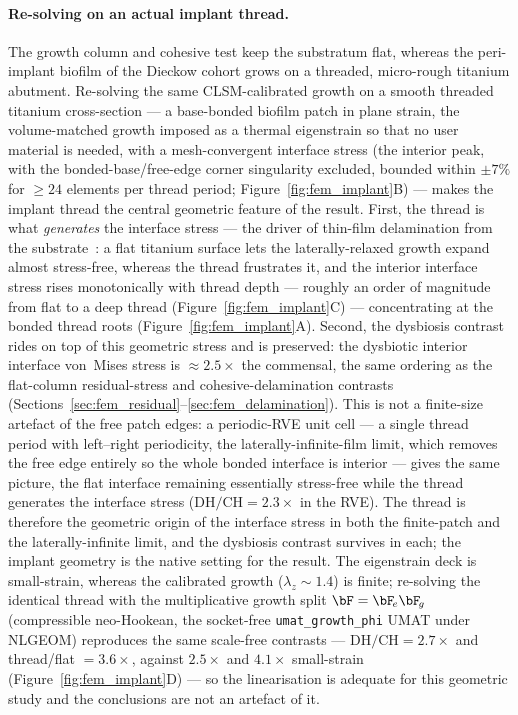 \paragraph{Re-solving on an actual implant thread.} The growth column and cohesive test keep
the substratum flat, whereas the peri-implant biofilm of the Dieckow cohort grows on a
threaded, micro-rough titanium abutment. Re-solving the same CLSM-calibrated growth on a smooth
threaded titanium cross-section --- a base-bonded biofilm patch in plane strain, the
volume-matched growth imposed as a thermal eigenstrain so that no user material is needed, with a
mesh-convergent interface stress (the interior peak, with the bonded-base/free-edge corner
singularity excluded, bounded within $\pm7\%$ for $\ge24$ elements per thread period;
Figure~\ref{fig:fem_implant}B) --- makes the implant thread the central geometric feature of the
result. First, the thread is what \emph{generates} the interface stress --- the driver of thin-film
delamination from the substrate~\cite{HutchinsonSuo1992}: a flat titanium surface
lets the laterally-relaxed growth expand almost stress-free, whereas the thread frustrates it,
and the interior interface stress rises monotonically with thread depth --- roughly an order of
magnitude from flat to a deep thread (Figure~\ref{fig:fem_implant}C) --- concentrating at the
bonded thread roots (Figure~\ref{fig:fem_implant}A). Second, the dysbiosis contrast rides on top
of this geometric stress and is preserved: the dysbiotic interior interface von~Mises stress is
$\approx\!2.5\times$ the commensal, the same ordering as the flat-column residual-stress and
cohesive-delamination contrasts (Sections~\ref{sec:fem_residual}--\ref{sec:fem_delamination}).
This is not a finite-size artefact of the free patch edges: a periodic-RVE unit cell --- a single
thread period with left--right periodicity, the laterally-infinite-film limit, which removes the
free edge entirely so the whole bonded interface is interior --- gives the same picture, the flat
interface remaining essentially stress-free while the thread generates the interface stress
($\mathrm{DH/CH}=2.3\times$ in the RVE). The thread is therefore the geometric origin of the
interface stress in both the finite-patch and the laterally-infinite limit, and the dysbiosis
contrast survives in each; the implant geometry is the native setting for the result. The eigenstrain deck is small-strain, whereas the
calibrated growth ($\lambda_z\!\sim\!1.4$) is finite; re-solving the identical thread with the
multiplicative growth split $\bF=\bF_{\!e}\bF_{\!g}$ (compressible neo-Hookean, the socket-free
\texttt{umat\_growth\_phi} UMAT under NLGEOM) reproduces the same scale-free contrasts ---
$\mathrm{DH/CH}=2.7\times$ and thread/flat $=3.6\times$, against $2.5\times$ and $4.1\times$
small-strain (Figure~\ref{fig:fem_implant}D) --- so the linearisation is adequate for this geometric
study and the conclusions are not an artefact of it.

